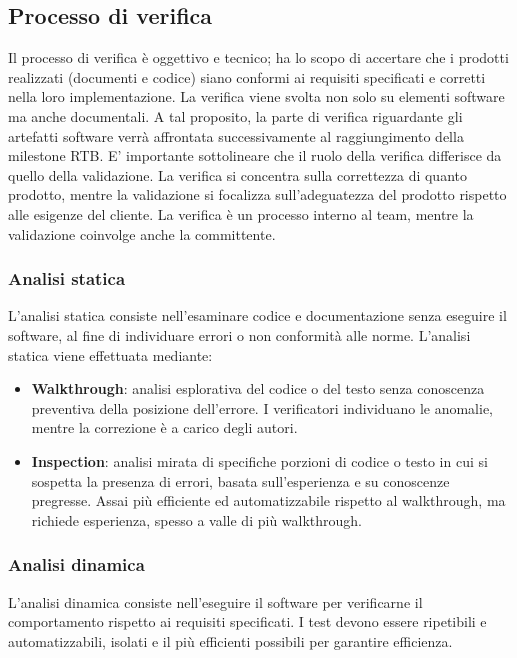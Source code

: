 \documentclass[a4paper,12pt]{article}
\begin{document}
\subsection{Processo di verifica}
Il processo di verifica è oggettivo e tecnico; ha lo scopo di accertare che i prodotti realizzati
(documenti e codice) siano conformi ai requisiti specificati e corretti nella loro implementazione.
La verifica viene svolta non solo su elementi software ma anche documentali.
A tal proposito, la parte di verifica riguardante gli artefatti software verrà affrontata successivamente al
raggiungimento della milestone RTB. E' importante sottolineare che il ruolo
della verifica differisce da quello della validazione. La verifica si concentra
sulla correttezza di quanto prodotto, mentre la validazione si focalizza
sull'adeguatezza del prodotto rispetto alle esigenze del cliente. La verifica è
un processo interno al team, mentre la validazione coinvolge anche la
committente.

\subsubsection{Analisi statica}
L'analisi statica consiste nell'esaminare codice e documentazione senza
eseguire il software, al fine di individuare errori o non conformità alle norme. L'analisi statica viene effettuata mediante:
\begin{itemize}
    \item \textbf{Walkthrough}: analisi esplorativa del codice o del testo senza conoscenza preventiva della posizione dell'errore. I verificatori individuano le anomalie, mentre la correzione è a carico degli autori.

    \item \textbf{Inspection}: analisi mirata di specifiche porzioni di codice o testo in cui si sospetta la presenza di errori, basata sull'esperienza e su conoscenze pregresse. Assai più efficiente ed automatizzabile rispetto al walkthrough, ma richiede esperienza, spesso a valle di più walkthrough.
\end{itemize}

\subsubsection{Analisi dinamica}
L'analisi dinamica consiste nell'eseguire il software per verificarne il
comportamento rispetto ai requisiti specificati. I test devono essere
ripetibili e automatizzabili, isolati e il più efficienti possibili per garantire
efficienza.
\end{document}
